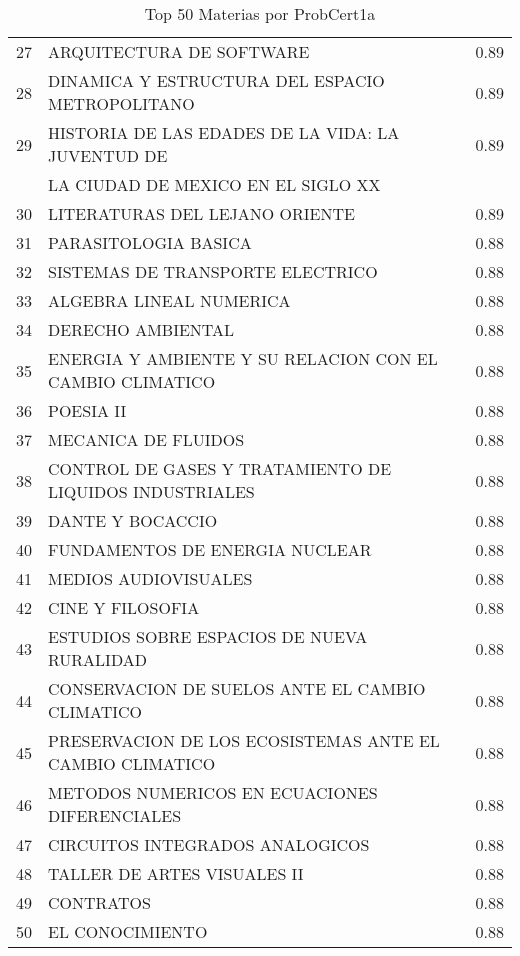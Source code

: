 \documentclass[12pt]{article}
\begin{document}
\begin{table}[ht]
{\begin{tabular}{clr}
  27 & ARQUITECTURA DE SOFTWARE & 0.89 \\
  28 & DINAMICA Y ESTRUCTURA DEL ESPACIO METROPOLITANO & 0.89 \\
  29 & HISTORIA DE LAS EDADES DE LA VIDA: LA JUVENTUD DE & 0.89 \\
  & LA CIUDAD DE MEXICO EN EL SIGLO XX & \\
  30 & LITERATURAS DEL LEJANO ORIENTE & 0.89 \\
  31 & PARASITOLOGIA BASICA & 0.88 \\
  32 & SISTEMAS DE TRANSPORTE ELECTRICO & 0.88 \\
  33 & ALGEBRA LINEAL NUMERICA & 0.88 \\
  34 & DERECHO AMBIENTAL & 0.88 \\
  35 & ENERGIA Y AMBIENTE Y SU RELACION CON EL CAMBIO CLIMATICO & 0.88 \\
  36 & POESIA II & 0.88 \\
  37 & MECANICA DE FLUIDOS & 0.88 \\
  38 & CONTROL DE GASES Y TRATAMIENTO DE LIQUIDOS INDUSTRIALES & 0.88 \\
  39 & DANTE Y BOCACCIO & 0.88 \\
  40 & FUNDAMENTOS DE ENERGIA NUCLEAR & 0.88 \\
  41 & MEDIOS AUDIOVISUALES & 0.88 \\
  42 & CINE Y FILOSOFIA & 0.88 \\
  43 & ESTUDIOS SOBRE ESPACIOS DE NUEVA RURALIDAD & 0.88 \\
  44 & CONSERVACION DE SUELOS ANTE EL CAMBIO CLIMATICO & 0.88 \\
  45 & PRESERVACION DE LOS ECOSISTEMAS ANTE EL CAMBIO CLIMATICO & 0.88 \\
  46 & METODOS NUMERICOS EN ECUACIONES DIFERENCIALES & 0.88 \\
  47 & CIRCUITOS INTEGRADOS ANALOGICOS & 0.88 \\
  48 & TALLER DE ARTES VISUALES II & 0.88 \\
  49 & CONTRATOS & 0.88 \\
  50 & EL CONOCIMIENTO & 0.88 \\
  \hline
\end{tabular}}
\caption{Top 50 Materias por ProbCert1a}
\end{table}
\end{document}
